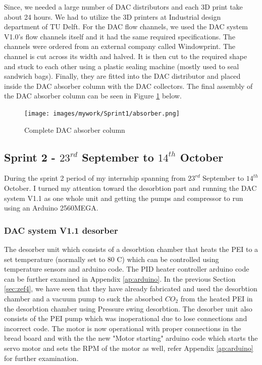 Since, we needed a large number of DAC distributors and each 3D print take about 24 hours. We had to utilize the 3D printers at Industrial design department of TU Delft. For the DAC flow channels, we used the DAC system V1.0's flow channels itself and it had the same required specifications. The channels were ordered from an external company called Windowprint. The channel is cut across its width and halved. It is then cut to the required shape and stuck to each other using a plastic sealing machine (mostly used to seal sandwich bags). Finally, they are fitted into the DAC distributor and placed inside the DAC absorber column with the DAC collectors. The final assembly of the DAC absorber column can be seen in Figure \ref{fig:absorber} below.  

\begin{figure}[H]
    \centering
    \texttt{[image: images/mywork/Sprint1/absorber.png]}
    \caption{Complete DAC absorber column}
    \label{fig:absorber}
\end{figure}

\subsection{Sprint 2 - $23^{rd}$ September to $14^{th}$ October}

During the sprint 2 period of my internship spanning from $23^{rd}$ September to $14^{th}$ October. I turned my attention toward the desorbtion part and running the DAC system V1.1 as one whole unit and getting the pumps and compressor to run using an Arduino 2560MEGA.  

\subsubsection{DAC system V1.1 desorber}
\label{sec:faultycomp}

The desorber unit which consists of a desorbtion chamber that heats the PEI to a set temperature (normally set to 80 \degree C) which can be controlled using temperature sensors and arduino code. The PID heater controller arduino code can be further examined in Appendix \ref{ap:arduino}. In the previous Section \ref{sec:zef4}, we have seen that they have already fabricated and used the desorbtion chamber and a vacuum pump to suck the absorbed $CO_2$ from the heated PEI in the desorbtion chamber using Pressure swing desorbtion. The desorber unit also consists of the PEI pump which was inoperational due to lose connections and incorrect code. The motor is now operational with proper connections in the bread board and with the the new "Motor starting" arduino code which starts the servo motor and sets the RPM of the motor as well, refer Appendix \ref{ap:arduino} for further examination. %

